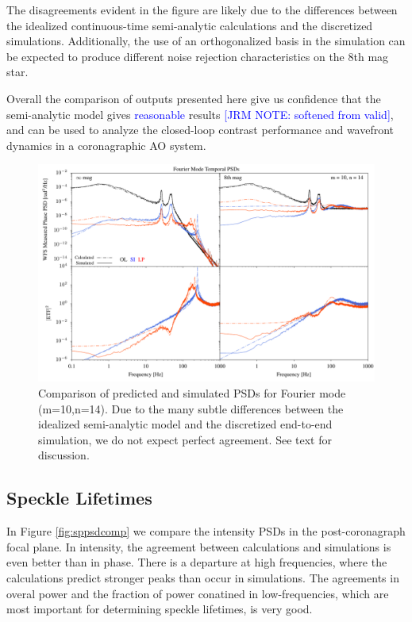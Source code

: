 \documentclass[10pt,preprint]{aastex631}
\newcommand{\jrmadd}[1]{\textcolor{blue}{#1}}
\begin{document}
The disagreements evident in the figure are likely due to the differences between the idealized continuous-time semi-analytic calculations and the discretized simulations.  Additionally, the use of an orthogonalized basis in the simulation can be expected to produce different noise rejection characteristics on the 8th mag star.  

Overall the comparison of outputs presented here give us confidence that the semi-analytic model gives \jrmadd{reasonable} results \jrmadd{[JRM NOTE: softened from valid]}, and can be used to analyze the closed-loop contrast performance and wavefront dynamics in a coronagraphic AO system.

\begin{figure}
\hspace{-0.3in}
\includegraphics[width=6.5in]{psdcomp_10_14.pdf}
\caption{Comparison of predicted and simulated PSDs for Fourier mode (m=10,n=14).  Due to the many subtle differences between the idealized semi-analytic model and the discretized end-to-end simulation, we do not expect perfect agreement.  See text for discussion.    \label{fig:opd_psdcomp}}
\end{figure}


\subsection{Speckle Lifetimes}

In Figure \ref{fig:sppsdcomp} we compare the intensity PSDs in the post-coronagraph focal plane.  In intensity, the agreement between calculations and simulations is even better than in phase.  There is a departure at high frequencies, where the calculations predict stronger peaks than occur in simulations. The agreements in overal power and the fraction of power conatined in low-frequencies, which are most important for determining speckle lifetimes, is very good.
\end{document}
